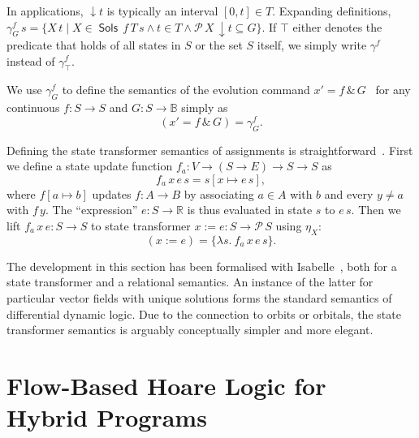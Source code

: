 \documentclass[envcountsames]{llncs}
\newcommand{\Pow}{\mathcal{P}}
\newcommand{\reals}{\mathbb{R}}
\newcommand{\bools}{\mathbb{B}}
\newcommand{\Sols}{\mathop{\mathsf{Sols}}}
\begin{document}
In applications, ${\downarrow}t$ is typically an interval
$[0,t]\in T$.  Expanding definitions,
$\gamma^f_G\, s = \{X\, t \mid X\in \Sols\, f\, T\, s \land t\in T
\land \Pow\, X\, {\downarrow}t\subseteq G\}$.
If $\top$ either denotes the predicate that holds of all states in $S$
or the set $S$ itself, we simply write $\gamma^f$ instead of
$\gamma^f_\top$.

We use $\gamma^f_G$ to define the semantics of the evolution command
$x'= f\, \&\, G$~\cite{MuniveS19} for any continuous $f:S\to S$ and
$G:S\to \bools$ simply as
\begin{equation}
{(x'= f\, \&\, G)} = \gamma^f_G.\label{eq:st-evl}\tag{st-evl}
\end{equation}

Defining the state transformer semantics of assignments is
straightforward~\cite{MuniveS19}. First we define a state update
function $f_a:V\to (S \to E) \to S\to S$ as
\begin{equation*}
f_a\, x\, e\, s = s[x\mapsto e\, s],
\end{equation*}
where $f[a\mapsto b]$ updates $f:A\to B$ by associating $a\in A$ with
$b$ and every $y\neq a$ with $f\, y$.  The ``expression''
${e:S\to \reals}$ is thus evaluated in state $s$ to $e\, s$.  Then we
lift $f_a\, x\, e:S\to S$ to state transformer
$x:= e:S \to \Pow\, S$ using $\eta_X$:
\begin{equation}
  (x:= e) = \{\lambda s.\ f_a\, x\, e\, s\}.\label{eq:st-assgn}\tag{st-assgn}
\end{equation}

The development in this section has been formalised with
Isabelle~\cite{afp:hybrid}, both for a state transformer and a
relational semantics. An instance of the latter for particular vector
fields with unique solutions forms the standard semantics of
differential dynamic logic. Due to the connection to orbits or
orbitals, the state transformer semantics is arguably conceptually
simpler and more elegant.




\section{Flow-Based Hoare Logic for Hybrid
  Programs}\label{sec:hoare-flow}
\end{document}
